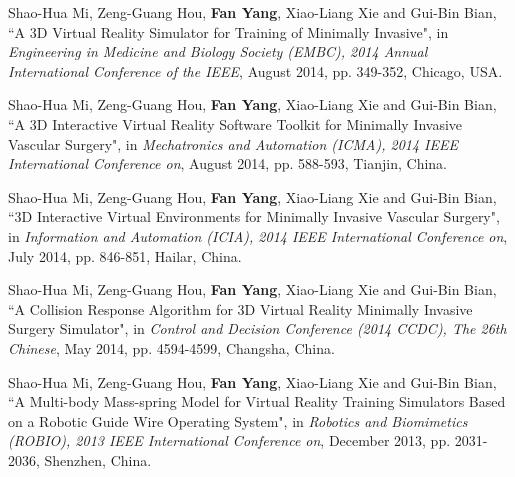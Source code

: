 \begin{publications}{99}
\item Shao-Hua Mi, Zeng-Guang Hou, \textbf{Fan Yang}, Xiao-Liang Xie and Gui-Bin Bian, ``A 3D Virtual Reality Simulator for Training of Minimally Invasive", in \textit{Engineering in Medicine and Biology Society (EMBC), 2014 Annual International Conference of the IEEE}, August 2014, pp. 349-352, Chicago, USA.%

\item Shao-Hua Mi, Zeng-Guang Hou, \textbf{Fan Yang}, Xiao-Liang Xie and Gui-Bin Bian, ``A 3D Interactive Virtual Reality Software Toolkit for Minimally Invasive Vascular Surgery", in \textit{Mechatronics and Automation (ICMA), 2014 IEEE International Conference on}, August 2014, pp. 588-593, Tianjin, China.%

\item Shao-Hua Mi, Zeng-Guang Hou, \textbf{Fan Yang}, Xiao-Liang Xie and Gui-Bin Bian, ``3D Interactive Virtual Environments for Minimally Invasive Vascular Surgery", in \textit{Information and Automation (ICIA), 2014 IEEE International Conference on}, July 2014, pp. 846-851, Hailar, China.%

\item Shao-Hua Mi, Zeng-Guang Hou, \textbf{Fan Yang}, Xiao-Liang Xie and Gui-Bin Bian, ``A Collision Response Algorithm for 3D Virtual Reality Minimally Invasive Surgery Simulator", in \textit{Control and Decision Conference (2014 CCDC), The 26th Chinese}, May 2014, pp. 4594-4599, Changsha, China.%

\item Shao-Hua Mi, Zeng-Guang Hou, \textbf{Fan Yang}, Xiao-Liang Xie and Gui-Bin Bian, ``A Multi-body Mass-spring Model for Virtual Reality Training Simulators Based on a Robotic Guide Wire Operating System", in \textit{Robotics and Biomimetics (ROBIO), 2013 IEEE International Conference on}, December 2013, pp. 2031-2036, Shenzhen, China.%

\end{publications}

